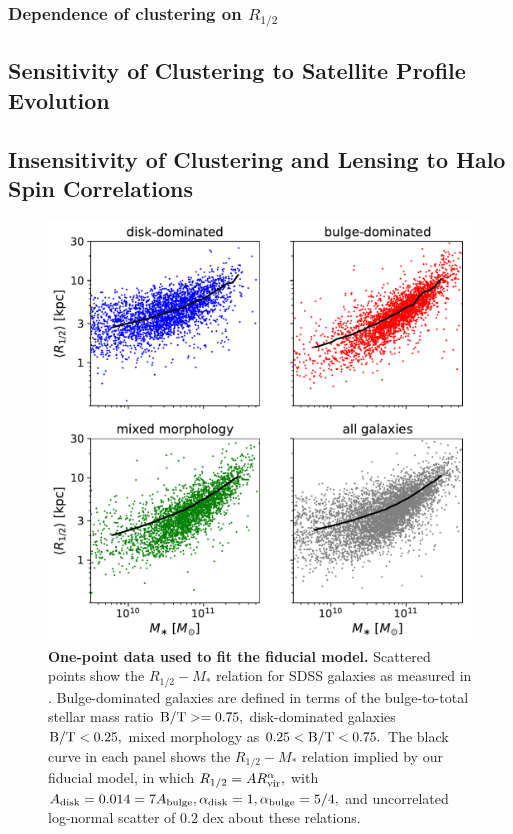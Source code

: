 \documentclass[usenatbib,usegraphicx,letterpaper]{mn2e}
\newcommand{\rhalf}{R_{1/2}}
\newcommand{\adisk}{A_{\rm disk}}
\newcommand{\abulge}{A_{\rm bulge}}
\newcommand{\alphadisk}{\alpha_{\rm disk}}
\newcommand{\alphabulge}{\alpha_{\rm bulge}}
\newcommand{\rvir}{R_{\rm vir}}
\newcommand{\bt}{{\rm B/T}}
\newcommand{\mstar}{M_{\ast}}
\begin{document}
\subsubsection{Dependence of clustering on $\rhalf$}
\label{subsubsec:clustering_tests}

\subsection{Sensitivity of Clustering to Satellite Profile Evolution}
\label{subsec:tests2}


\subsection{Insensitivity of Clustering and Lensing to Halo Spin Correlations}
\label{subsec:tests3}

\begin{figure}
\centering
\includegraphics[width=12cm]{FIGS/size_vs_stellar_mass_multipanel_bt_decomposition.pdf}
\caption{
{\bf One-point data used to fit the fiducial model.}
Scattered points show the $\rhalf-\mstar$ relation for SDSS galaxies as measured in \citet{meert_etal15}. Bulge-dominated galaxies are defined in terms of the bulge-to-total stellar mass ratio $\bt>=0.75,$ disk-dominated galaxies $\bt<0.25,$ mixed morphology as $0.25 < \bt < 0.75.$ The black curve in each panel shows the $\rhalf-\mstar$ relation implied by our fiducial model, in which $\rhalf=A\rvir^\alpha,$ with $\adisk=0.014=7\abulge, \alphadisk=1, \alphabulge=5/4,$ and uncorrelated log-normal scatter of $0.2$ dex about these relations. 
}
\label{fig:scatter_plot}
\end{figure}
\end{document}
